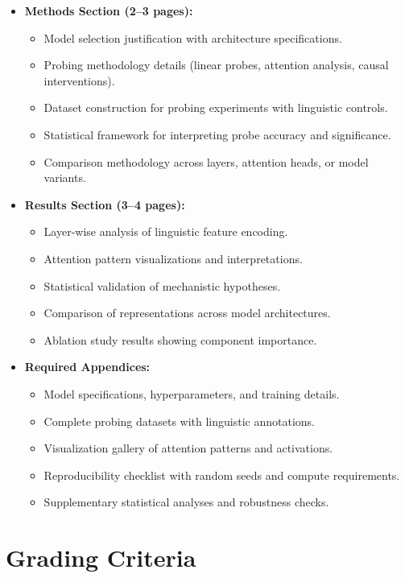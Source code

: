 \documentclass[10pt,letterpaper]{article}
\begin{document}
\begin{graybox}
\begin{itemize}
  \item \textbf{Methods Section (2--3 pages):}
    \begin{itemize}
      \item Model selection justification with architecture specifications.
      \item Probing methodology details (linear probes, attention analysis, causal interventions).
      \item Dataset construction for probing experiments with linguistic controls.
      \item Statistical framework for interpreting probe accuracy and significance.
      \item Comparison methodology across layers, attention heads, or model variants.
    \end{itemize}
  \item \textbf{Results Section (3--4 pages):}
    \begin{itemize}
      \item Layer-wise analysis of linguistic feature encoding.
      \item Attention pattern visualizations and interpretations.
      \item Statistical validation of mechanistic hypotheses.
      \item Comparison of representations across model architectures.
      \item Ablation study results showing component importance.
    \end{itemize}
  \item \textbf{Required Appendices:}
    \begin{itemize}
      \item Model specifications, hyperparameters, and training details.
      \item Complete probing datasets with linguistic annotations.
      \item Visualization gallery of attention patterns and activations.
      \item Reproducibility checklist with random seeds and compute requirements.
      \item Supplementary statistical analyses and robustness checks.
    \end{itemize}
\end{itemize}
\end{graybox}

\section{Grading Criteria}
\end{document}
